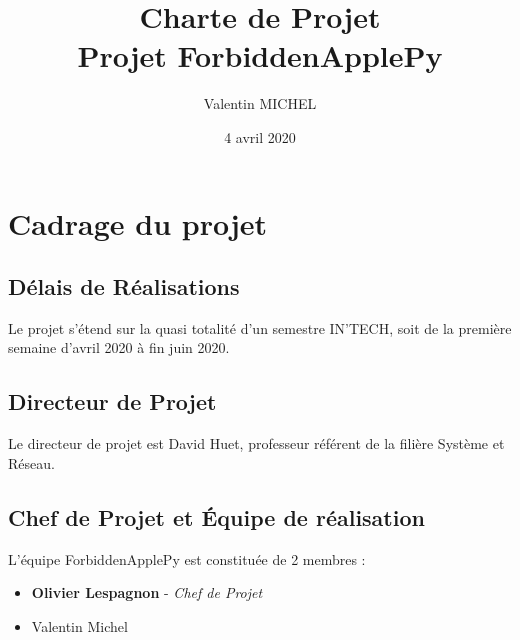 \documentclass[14pt,a4paper]{extarticle}
\author{Valentin MICHEL}
\date{4 avril 2020}
\title{Charte de Projet \\ Projet ForbiddenApplePy}
\begin{document}
\maketitle{}
\justify
\break
\tableofcontents
\break
\section{Cadrage du projet}
\subsection{Délais de Réalisations}
Le projet s'étend sur la quasi totalité d'un semestre IN'TECH, soit de la première semaine d'avril 2020 à fin juin 2020.

\subsection{Directeur de Projet}
Le directeur de projet est David Huet, professeur référent de la filière Système et Réseau.

\subsection{Chef de Projet et Équipe de réalisation}
L'équipe ForbiddenApplePy est constituée de 2 membres :
\begin{itemize}
    \item{\textbf{Olivier Lespagnon} - \textit{Chef de Projet}}
    \item{Valentin Michel}
\end{itemize}
\end{document}
